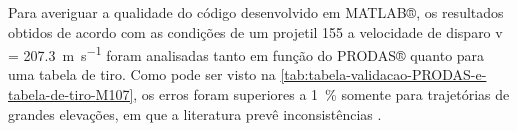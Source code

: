 Para averiguar a qualidade do código desenvolvido em MATLAB®, os resultados obtidos de acordo com as condições de um projetil \qty{155}{\millimetre} a velocidade de disparo v = \qty{207,3}{\metre\per\second} foram analisadas tanto em função do PRODAS® quanto para uma tabela de tiro. Como pode ser visto na \autoref{tab:tabela-validacao-PRODAS-e-tabela-de-tiro-M107}, os erros foram superiores a \qty{1}{\percent} somente para trajetórias de grandes elevações, em que a literatura prevê inconsistências \cite{McCoy2012,Carlucci2018}.

\begin{table}[ht]
    \centering
    \caption[Resultados obtidos durante a validação (munição \qty{155}{\millimetre} M107)]{Resultados obtidos durante a validação (munição \qty{155}{\millimetre} M107)}
    \vspace{0.5cm}
\end{table}
